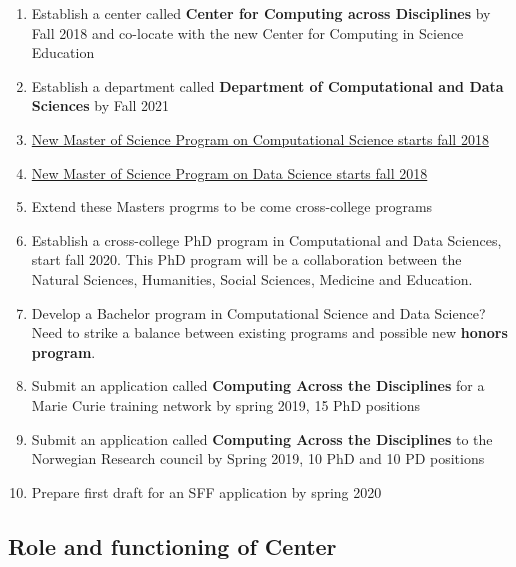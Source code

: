 \documentclass[%
oneside,                 %
final,                   %
10pt]{article}
\begin{document}
\begin{enumerate}
\item Establish a center called \textbf{Center for Computing across Disciplines} by Fall 2018 and co-locate with the new Center for Computing in Science Education

\item Establish a department  called \textbf{Department of Computational and Data Sciences} by Fall 2021

\item \href{{http://www.uio.no/english/studies/programmes/computational-science-master/index.html}}{New Master of Science Program on Computational Science starts fall 2018}

\item \href{{http://www.uio.no/english/studies/programmes/datascience-master/index.html}}{New Master of Science Program on Data Science starts fall 2018}

\item Extend these Masters progrms to be come cross-college programs

\item Establish  a cross-college PhD program in Computational and Data Sciences, start fall 2020. This PhD program will be a collaboration between the Natural Sciences, Humanities, Social Sciences, Medicine and Education. 

\item Develop a Bachelor program in Computational Science and Data Science? Need to strike a balance between existing programs and possible new \textbf{honors program}. 

\item Submit an application called \textbf{Computing Across the Disciplines} for a Marie Curie training network by spring 2019, 15 PhD positions

\item Submit an application called \textbf{Computing Across the Disciplines} to the Norwegian Research council by Spring 2019, 10 PhD and 10 PD positions

\item Prepare first draft for an SFF application by  spring 2020
\end{enumerate}

\noindent
\subsection{Role and functioning of Center}
\end{document}
